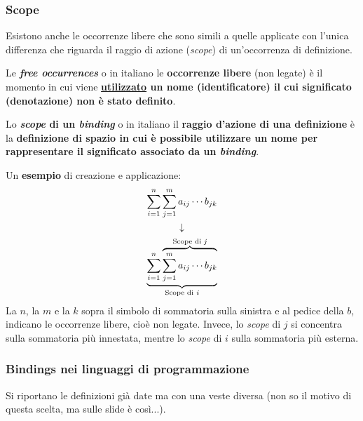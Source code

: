 \documentclass[a4paper]{article}
\begin{document}
	\subsubsection{Scope}
	
	Esistono anche le occorrenze libere che sono simili a quelle applicate con l'unica differenza che riguarda il raggio di azione (\emph{scope}) di un'occorrenza di definizione.\newline
	
	\noindent
	\begin{boxdef}
		Le \textcolor{Red3}{\textbf{\emph{free occurrences}}} o in italiano le \textcolor{Red3}{\textbf{occorrenze libere}} (non legate) è il momento in cui viene \textbf{\underline{utilizzato} un nome (identificatore) il cui significato (denotazione) non è stato definito}.
	\end{boxdef}\:\newline

	\noindent
	\begin{boxdef}
		Lo \textcolor{Red3}{\textbf{\emph{scope} di un \emph{binding}}} o in italiano il \textcolor{Red3}{\textbf{raggio d'azione di una definizione}} è la \textbf{definizione di spazio in cui è possibile utilizzare un nome per rappresentare il significato associato da un \emph{binding}}.
	\end{boxdef}\:\newline

	\noindent
	Un \textcolor{Green4}{\textbf{esempio}} di creazione e applicazione:
	\begin{gather*}
		\displaystyle\sum_{i=1}^{n}\sum_{j=1}^{m}a_{ij} \cdots b_{jk} \\
		\downarrow \\
		\displaystyle\underbrace{\sum_{i=1}^{n}\overbrace{\sum_{j=1}^{m} a_{ij} \cdots b_{jk}}^{\text{Scope di \emph{j}}}}_{\text{Scope di \emph{i}}}
	\end{gather*}
	La $n$, la $m$ e la $k$ sopra il simbolo di sommatoria sulla sinistra e al pedice della $b$, indicano le occorrenze libere, cioè non legate. Invece, lo \emph{scope} di $j$ si concentra sulla sommatoria più innestata, mentre lo \emph{scope} di $i$ sulla sommatoria più esterna.\newpage
	
	
	\subsubsection{Bindings nei linguaggi di programmazione}
	
	Si riportano le definizioni già date ma con una veste diversa (non so il motivo di questa scelta, ma sulle slide è così...).\newline
	
\end{document}
